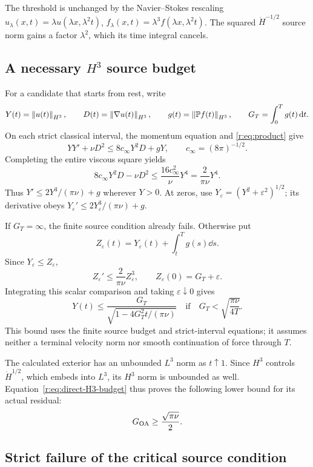The threshold is unchanged by the Navier--Stokes rescaling
\(u_\lambda(x,t)=\lambda u(\lambda x,\lambda^2t)\),
\(f_\lambda(x,t)=\lambda^3f(\lambda x,\lambda^2t)\).
The squared \(\dot H^{-1/2}\) source norm gains a factor
\(\lambda^2\), which its time integral cancels.

\subsection{A necessary \texorpdfstring{\(H^3\)}{H3} source budget}

For a candidate that starts from rest, write
\[
 Y(t)=\left\lVert u(t)\right\rVert_{H^3},\qquad
 D(t)=\left\lVert \nabla u(t)\right\rVert_{H^3},\qquad
 g(t)=\left\lVert \mathbb P f(t)\right\rVert_{H^3},\qquad
 G_T=\int_0^Tg(t)\,\mathrm d t.
\]
On each strict classical interval, the momentum equation and
\eqref{r:eq:product} give
\[
 YY'+\nu D^2\le8c_\infty Y^2D+gY,
 \qquad c_\infty=(8\pi)^{-1/2}.
\]
Completing the entire viscous square yields
\[
 8c_\infty Y^2D-\nu D^2
 \le\frac{16c_\infty^2}{\nu}Y^4
 =\frac2{\pi\nu}Y^4.
\]
Thus \(Y'\le2Y^3/(\pi\nu)+g\) wherever \(Y>0\).
At zeros, use \(Y_\varepsilon=(Y^2+\varepsilon^2)^{1/2}\);
its derivative obeys
\(Y_\varepsilon'\le2Y_\varepsilon^3/(\pi\nu)+g\).

If \(G_T=\infty\), the finite source condition already fails. Otherwise
put
\[
 Z_\varepsilon(t)=Y_\varepsilon(t)+\int_t^Tg(s)\dd s.
\]
Since \(Y_\varepsilon\le Z_\varepsilon\),
\[
 Z_\varepsilon'\le\frac2{\pi\nu}Z_\varepsilon^3,
 \qquad Z_\varepsilon(0)=G_T+\varepsilon.
\]
Integrating this scalar comparison and taking \(\varepsilon\downarrow0\)
gives
\begin{equation}
 Y(t)\le
 \frac{G_T}{\sqrt{1-4G_T^2t/(\pi\nu)}}
 \quad\text{if}\quad
 G_T<\sqrt{\frac{\pi\nu}{4T}}.
 \label{r:eq:direct-H3-budget}
\end{equation}
This bound uses the finite source budget and strict-interval equations;
it assumes neither a terminal velocity norm nor smooth continuation of
force through \(T\).

The calculated exterior has an unbounded \(L^3\) norm as \(t\uparrow1\).
Since \(H^3\) controls \(\dot H^{1/2}\), which embeds into \(L^3\),
its \(H^3\) norm is unbounded as well. Equation~\eqref{r:eq:direct-H3-budget}
thus proves the following lower bound for its actual residual:
\begin{equation}
 G_{\rm OA}\ge\frac{\sqrt{\pi\nu}}2.
 \label{r:eq:actual-H3-budget-failure}
\end{equation}

\subsection{Strict failure of the critical source condition}

